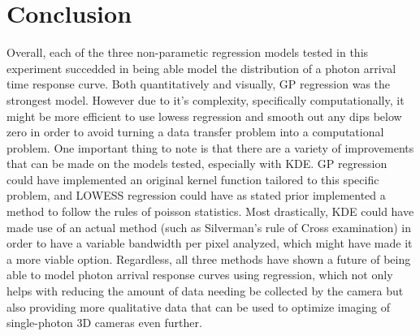 \documentclass[letterpaper,12pt]{article}
\begin{document}
\begin{table}[H]
\centering
{}
\caption{Error statistics for EDH}
\end{table}

\section{Conclusion}
Overall, each of the three non-parametic regression models tested in this experiment succedded 
in being able model the distribution of a photon arrival time response curve. Both quantitatively
and visually, GP regression was the strongest model. However due to it's complexity, specifically 
computationally, it might be more efficient to use lowess regression and smooth out any dips 
below zero in order to avoid turning a data transfer problem into a computational problem. One
important thing to note is that there are a variety of improvements that can be made on the models
tested, especially with KDE. GP regression could have implemented an original kernel function
tailored to this specific problem, and LOWESS regression could have as stated prior implemented
a method to follow the rules of poisson statistics. Most drastically, KDE could have made use
of an actual method (such as Silverman's rule of Cross examination) in order to have a variable
bandwidth per pixel analyzed, which might have made it a more viable option. Regardless, all
three methods have shown a future of being able to model photon arrival response curves using
regression, which not only helps with reducing the amount of data needing be collected by the
camera but also providing more qualitative data that can be used to optimize imaging of
single-photon 3D cameras even further.
\end{document}
